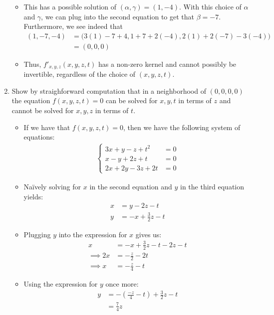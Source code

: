 \documentclass[10pt,a4paper]{article}
\theoremstyle{definition}
\theoremstyle{definition}
\numberwithin{equation}{section}
\begin{document}
\begin{enumerate}[label = (\alph*)]
\begin{itemize}
	\item This has a possible solution of $(\alpha, \gamma) = (1, -4)$. With this choice of $\alpha$ and $\gamma$, we can plug into the second equation to get that $\beta = -7$. Furthermore, we see indeed that
	\begin{align*}
	[f'_{x, y, z}(x, y, z, t)](1, -7, -4) &= \bigg(3(1) - 7 + 4, 1 + 7 + 2(-4), 2(1) + 2(-7) - 3(-4) \bigg)\\
	&= (0,0,0)
	\end{align*}
	\item Thus, $f'_{x, y, z}(x, y, z, t)$ has a non-zero kernel and cannot possibly be invertible, regardless of the choice of $(x, y, z, t)$.
	\end{itemize}
\item Show by straighforward computation that in a neighborhood of $(0, 0, 0, 0)$ the equation $f(x, y, z, t) = 0$ can be solved for $x, y, t$ in terms of $z$ and cannot be solved for $x, y, z$ in terms of $t$. 
	\begin{itemize}
	\item If we have that $f(x, y, z, t) = 0$, then we have the following system of equations:
	\begin{align*}
	\begin{cases}
	3x + y - z + t^2 &= 0\\
	x - y + 2z + t &= 0\\
	2x + 2y - 3z + 2t &= 0
	\end{cases}
	\end{align*}
	\item Na\"ively solving for $x$ in the second equation and $y$ in the third equation yields:
	\begin{align*}
	x &= y - 2z - t\\
	y &= -x + \frac{3}{2}z - t
	\end{align*}
	\item Plugging $y$ into the expression for $x$ gives us:
	\begin{align*}
	x &= -x + \frac{3}{2}z - t - 2z - t\\
	\implies 2x &= -\frac{z}{2} - 2t\\
	\implies x &= -\frac{z}{4} - t
	\end{align*}
	\item Using the expression for $y$ once more:
	\begin{align*}
	y &= -\left(\frac{-z}{4} - t\right) + \frac{3}{2}z - t\\
	&= \frac{7}{4}z
	\end{align*}

\end{itemize}
\end{enumerate}
\end{document}
